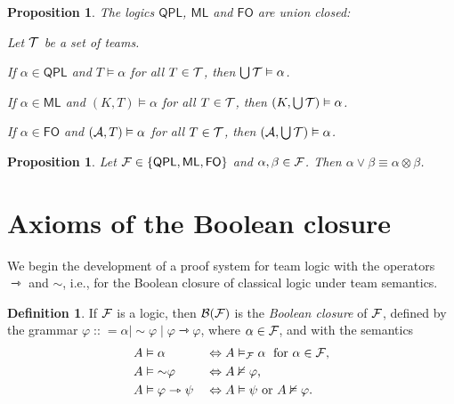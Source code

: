 \documentclass[a4paper,english,fleqn,11pt,final]{scrartcl}
\makeatletter
\newcommand{\ie}{i.e.\@\xspace}
\newcommand{\negg}{{\sim}}
\newcommand{\logic}[1]{\ensuremath{\mathsf{#1}}\xspace}
\newcommand{\QPL}{\logic{QPL}}
\newcommand{\ML}{\logic{ML}}
\newcommand{\FO}{\logic{FO}}
\newcommand{\calA}{\protect\ensuremath{\mathcal{A}}}
\newcommand{\calB}{\protect\ensuremath{\mathcal{B}}}
\newcommand{\calF}{\protect\ensuremath{\mathcal{F}}}
\newcommand{\calT}{\protect\ensuremath{\mathcal{T}}}
\providecommand{\ddfn}{\mathrel{\mathop{{\mathop:}{\mathop:}}}=}
\newcommand{\timp}{\rightarrowtriangle}
\newcommand{\tens}{\otimes}
\theoremstyle{plain}
\newtheorem{proposition}[theorem]{Proposition}
\theoremstyle{definition}
\newtheorem{definition}[theorem]{Definition}
\makeatother
\begin{document}
\begin{proposition}\label{prop:union-closure}
The logics $\QPL$, $\ML$ and $\FO$ are \emph{union closed}:

Let $\calT$ be a set of teams.

If $\alpha \in \QPL$ and $T \vDash \alpha$ for all $T \in \calT$, then $\bigcup\calT \vDash \alpha$.

If $\alpha \in \ML$ and $(K,T) \vDash \alpha$ for all $T \in \calT$, then $(K,\bigcup\calT) \vDash \alpha$.

If $\alpha \in \FO$ and $(\calA,T) \vDash \alpha$ for all $T \in \calT$, then $(\calA,\bigcup\calT) \vDash \alpha$.
\end{proposition}

\begin{proposition}\label{prop:flatness-tens}
Let $\calF \in \{\QPL, \ML, \FO\}$ and $\alpha, \beta \in \calF$.
Then $\alpha \lor \beta \equiv \alpha \tens \beta$.
\end{proposition}
 

\section{Axioms of the Boolean closure}\label{sec:boolean}

We begin the development of a proof system for team logic with the operators $\timp$ and $\negg$, \ie, for the Boolean closure of classical logic under team semantics.

\begin{definition}
If $\calF$ is a logic, then $\calB(\calF)$ is the \emph{Boolean closure} of $\calF$, defined by the grammar
$\varphi \ddfn \alpha \mid \negg\varphi \mid \varphi \timp \varphi$,
where $\alpha \in \calF$, and with the semantics
\begin{alignat*}{2}
    &A \vDash \alpha&& \Leftrightarrow A \vDash_{\calF} \alpha\;\text{ for $\alpha \in \calF$,}\\
    &A \vDash \negg\varphi&&\Leftrightarrow A \nvDash \varphi\text{,}\\
    &A \vDash \varphi \timp \psi&&\Leftrightarrow A \vDash \psi \text{ or }A\nvDash \varphi\text{.}
\end{alignat*}
\end{definition}
\end{document}
